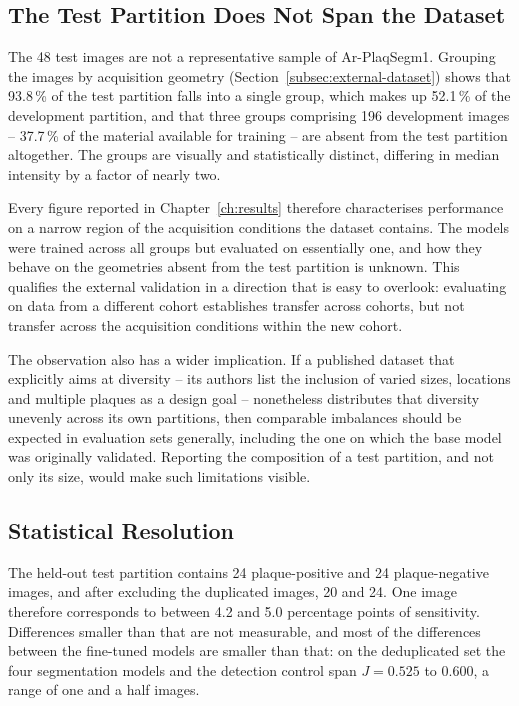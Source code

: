 \subsection{The Test Partition Does Not Span the Dataset}

The 48 test images are not a representative sample of Ar-PlaqSegm1. Grouping the images by
acquisition geometry (Section~\ref{subsec:external-dataset}) shows that 93.8\,\% of the test
partition falls into a single group, which makes up 52.1\,\% of the development partition, and
that three groups comprising 196 development images -- 37.7\,\% of the material available for
training -- are absent from the test partition altogether. The groups are visually and
statistically distinct, differing in median intensity by a factor of nearly two.

Every figure reported in Chapter~\ref{ch:results} therefore characterises performance on a narrow
region of the acquisition conditions the dataset contains. The models were trained across all
groups but evaluated on essentially one, and how they behave on the geometries absent from the
test partition is unknown. This qualifies the external validation in a direction that is easy to
overlook: evaluating on data from a different cohort establishes transfer across cohorts, but not
transfer across the acquisition conditions within the new cohort.

The observation also has a wider implication. If a published dataset that explicitly aims at
diversity -- its authors list the inclusion of varied sizes, locations and multiple plaques as a
design goal -- nonetheless distributes that diversity unevenly across its own partitions, then
comparable imbalances should be expected in evaluation sets generally, including the one on which
the base model was originally validated. Reporting the composition of a test partition, and not
only its size, would make such limitations visible.


\subsection{Statistical Resolution}

The held-out test partition contains 24 plaque-positive and 24 plaque-negative images, and after
excluding the duplicated images, 20 and 24. One image therefore corresponds to between 4.2 and
5.0 percentage points of sensitivity. Differences smaller than that are not measurable, and most
of the differences between the fine-tuned models are smaller than that: on the deduplicated set
the four segmentation models and the detection control span $J = 0.525$ to $0.600$, a range of
one and a half images.

